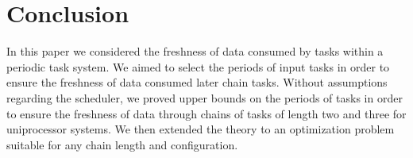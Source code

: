 \section{Conclusion}

In this paper we considered the freshness of data consumed by tasks within a periodic task system. We aimed to select the periods of input tasks in order to ensure the freshness of data consumed later chain tasks. Without assumptions regarding the scheduler, we proved upper bounds on the periods of tasks in order to ensure the freshness of data through chains of tasks of length two and three for uniprocessor systems. We then extended the theory to an optimization problem suitable for any chain length and configuration.